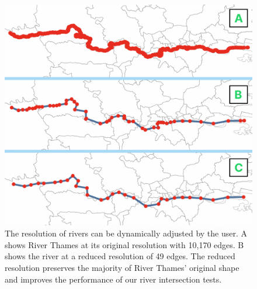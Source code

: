 {
\begin{figure}[tb!]
    \centering
    \includegraphics[width=\columnwidth]{figure/river_resolution.png}
    \caption{The resolution of rivers can be dynamically adjusted by the user. A shows River Thames at its original resolution with 10,170 edges. B shows the river at a reduced resolution of 49 edges.  The reduced resolution preserves the majority of River Thames' original shape and improves the performance of our river intersection tests.}
    \label{fig:river resolution}
\end{figure}
}

